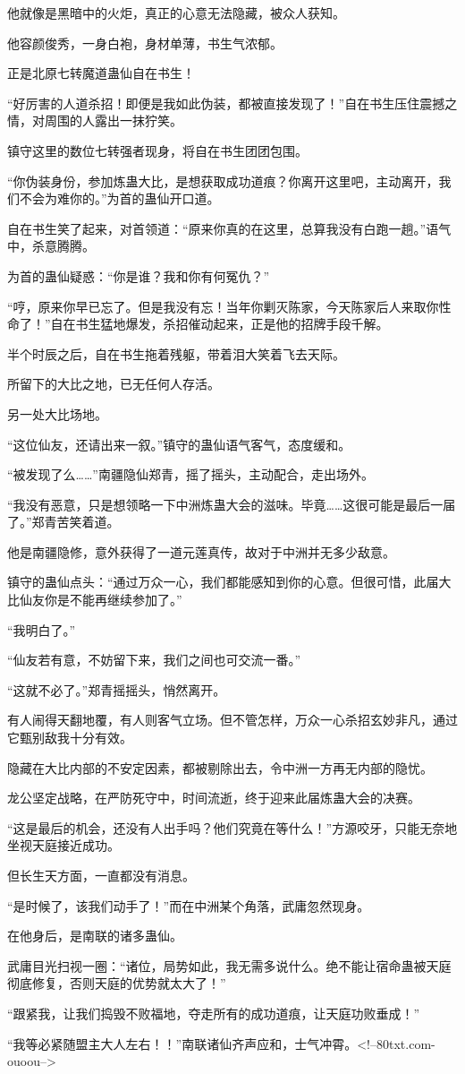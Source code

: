 \begin{this_body}
他就像是黑暗中的火炬，真正的心意无法隐藏，被众人获知。

他容颜俊秀，一身白袍，身材单薄，书生气浓郁。

正是北原七转魔道蛊仙自在书生！

“好厉害的人道杀招！即便是我如此伪装，都被直接发现了！”自在书生压住震撼之情，对周围的人露出一抹狞笑。

镇守这里的数位七转强者现身，将自在书生团团包围。

“你伪装身份，参加炼蛊大比，是想获取成功道痕？你离开这里吧，主动离开，我们不会为难你的。”为首的蛊仙开口道。

自在书生笑了起来，对首领道：“原来你真的在这里，总算我没有白跑一趟。”语气中，杀意腾腾。

为首的蛊仙疑惑：“你是谁？我和你有何冤仇？”

“哼，原来你早已忘了。但是我没有忘！当年你剿灭陈家，今天陈家后人来取你性命了！”自在书生猛地爆发，杀招催动起来，正是他的招牌手段千解。

半个时辰之后，自在书生拖着残躯，带着泪大笑着飞去天际。

所留下的大比之地，已无任何人存活。

另一处大比场地。

“这位仙友，还请出来一叙。”镇守的蛊仙语气客气，态度缓和。

“被发现了么……”南疆隐仙郑青，摇了摇头，主动配合，走出场外。

“我没有恶意，只是想领略一下中洲炼蛊大会的滋味。毕竟……这很可能是最后一届了。”郑青苦笑着道。

他是南疆隐修，意外获得了一道元莲真传，故对于中洲并无多少敌意。

镇守的蛊仙点头：“通过万众一心，我们都能感知到你的心意。但很可惜，此届大比仙友你是不能再继续参加了。”

“我明白了。”

“仙友若有意，不妨留下来，我们之间也可交流一番。”

“这就不必了。”郑青摇摇头，悄然离开。

有人闹得天翻地覆，有人则客气立场。但不管怎样，万众一心杀招玄妙非凡，通过它甄别敌我十分有效。

隐藏在大比内部的不安定因素，都被剔除出去，令中洲一方再无内部的隐忧。

龙公坚定战略，在严防死守中，时间流逝，终于迎来此届炼蛊大会的决赛。

“这是最后的机会，还没有人出手吗？他们究竟在等什么！”方源咬牙，只能无奈地坐视天庭接近成功。

但长生天方面，一直都没有消息。

“是时候了，该我们动手了！”而在中洲某个角落，武庸忽然现身。

在他身后，是南联的诸多蛊仙。

武庸目光扫视一圈：“诸位，局势如此，我无需多说什么。绝不能让宿命蛊被天庭彻底修复，否则天庭的优势就太大了！”

“跟紧我，让我们捣毁不败福地，夺走所有的成功道痕，让天庭功败垂成！”

“我等必紧随盟主大人左右！！”南联诸仙齐声应和，士气冲霄。<!--80txt.com-ouoou-->

\end{this_body}

